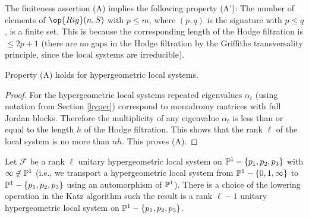 The  finiteness assertion (A) implies the following property (A'): The
number of elements of $\op{Rig}(n,S)$  with $p\leq m$, where $(p,q)$ is the signature with $p\leq q$, is a finite set. This is because the corresponding length of the Hodge filtration  is $\leq 2p+1$ (there are no gaps in the Hodge filtration by the Griffiths transversality principle, since the local systems are irreducible).


\begin{lemma}
\notready\label{lbelow}
Property (A) holds for hypergeometric local systems.
\end{lemma}
\begin{proof}

For the hypergeometric local systems repeated eigenvalues $\alpha_t$ (using notation from Section \ref{hyper})  correspond to monodromy matrices with full Jordan blocks. Therefore
the multiplicity of any eigenvalue $\alpha_t$ is less than or equal to the length $h$ of the Hodge filtration. This shows that the rank $\ell$ of the local system is no more than $nh$. This proves (A).
\end{proof}

\begin{lemma}
\notready\label{hyperreduction}
 Let $\mathcal{F}$ be a rank $\ell$ unitary hypergeometric local system on $\Bbb{P}^1-\{p_1,p_2,p_3\}$ with $\infty\not\in \Bbb{P}^1$ (i.e., we transport a hypergeometric local system from $\Bbb{P}^1-\{0,1,\infty\}$ to $\Bbb{P}^1-\{p_1,p_2,p_3\}$ using an automorphism of $\Bbb{P}^1$). There is a choice of the lowering operation in the Katz algorithm such the result is a rank $\ell-1$ unitary hypergeometric local system on $\Bbb{P}^1-\{p_1,p_2,p_3\}$.
 \end{lemma}
